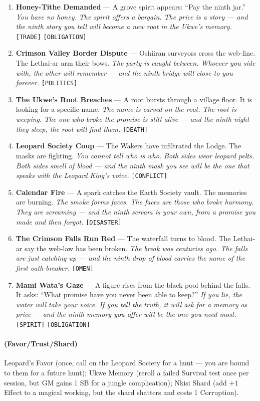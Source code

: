 \begin{enumerate}
\item \textbf{Honey-Tithe Demanded} --- A grove spirit appears: ``Pay the ninth jar.''
  \hfill \textit{You have no honey. The spirit offers a bargain. The price is a story --- and the ninth story you tell will become a new root in the Ukwe's memory.} \texttt{[TRADE]} \texttt{[OBLIGATION]}
\item \textbf{Crimson Valley Border Dispute} --- Oshiiran surveyors cross the web-line. The Lethai-ar arm their bows.
  \hfill \textit{The party is caught between. Whoever you side with, the other will remember --- and the ninth bridge will close to you forever.} \texttt{[POLITICS]}
\item[J] \textbf{The Ukwe's Root Breaches} --- A root bursts through a village floor. It is looking for a specific name.
  \hfill \textit{The name is carved on the root. The root is weeping. The one who broke the promise is still alive --- and the ninth night they sleep, the root will find them.} \texttt{[DEATH]}
\item[Q] \textbf{Leopard Society Coup} --- The Wakers have infiltrated the Lodge. The masks are fighting.
  \hfill \textit{You cannot tell who is who. Both sides wear leopard pelts. Both sides smell of blood --- and the ninth mask you see will be the one that speaks with the Leopard King's voice.} \texttt{[CONFLICT]}
\item[K] \textbf{Calendar Fire} --- A spark catches the Earth Society vault. The memories are burning.
  \hfill \textit{The smoke forms faces. The faces are those who broke harmony. They are screaming --- and the ninth scream is your own, from a promise you made and then forgot.} \texttt{[DISASTER]}
\item[A] \textbf{The Crimson Falls Run Red} --- The waterfall turns to blood. The Lethai-ar say the web-law has been broken.
  \hfill \textit{The break was centuries ago. The falls are just catching up --- and the ninth drop of blood carries the name of the first oath-breaker.} \texttt{[OMEN]}
\item[A+] \textbf{Mami Wata's Gaze} --- A figure rises from the black pool behind the falls. It asks: ``What promise have you never been able to keep?''
  \hfill \textit{If you lie, the water will take your voice. If you tell the truth, it will ask for a memory as price --- and the ninth memory you offer will be the one you need most.} \texttt{[SPIRIT]} \texttt{[OBLIGATION]}
\end{enumerate}

\paragraph*{(Favor/Trust/Shard)} Leopard's Favor (once, call on the Leopard Society for a hunt --- you are bound to them for a future hunt); Ukwe Memory (reroll a failed Survival test once per session, but GM gains 1 SB for a jungle complication); Nkisi Shard (add $+1$ Effect to a magical working, but the shard shatters and costs 1 Corruption).

